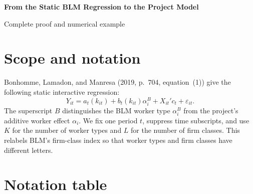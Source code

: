 \documentclass[11pt]{article}
\begin{document}
\begin{center}
\textbf{From the Static BLM Regression to the Project Model}

Complete proof and numerical example
\end{center}

\section*{Scope and notation}

Bonhomme, Lamadon, and Manresa (2019, p.~704, equation~(1)) give the
following static interactive regression:
\[
Y_{it}
=
a_t(k_{it})
+
b_t(k_{it})\alpha_i^B
+
X_{it}'c_t
+
\varepsilon_{it}.
\tag{BLM}
\]
The superscript \(B\) distinguishes the BLM worker type
\(\alpha_i^B\) from the project's additive worker effect \(\alpha_i\).
We fix one period \(t\), suppress time subscripts, and use \(K\) for the
number of worker types and \(L\) for the number of firm classes.  This
relabels BLM's firm-class index so that worker types and firm classes have
different letters.

\section*{Notation table}
\end{document}
